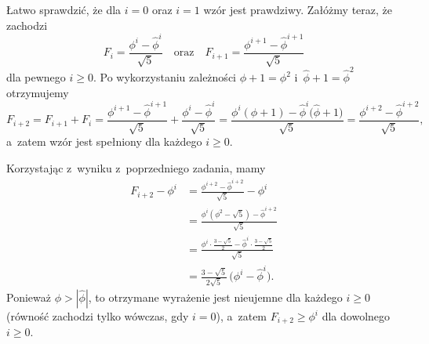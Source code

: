 \exercise %
Łatwo sprawdzić, że dla $i=0$ oraz $i=1$ wzór jest prawdziwy.
Załóżmy teraz, że zachodzi
\[
	F_i = \frac{\phi^i-\widehat\phi^i}{\sqrt{5}} \quad\text{oraz}\quad F_{i+1} = \frac{\phi^{i+1}-\widehat\phi^{i+1}}{\sqrt{5}}
\]
dla pewnego $i\ge0$.
Po wykorzystaniu zależności $\phi+1=\phi^2$ i~$\widehat\phi+1=\widehat\phi^2$ otrzymujemy
\[
	F_{i+2} = F_{i+1}+F_i = \frac{\phi^{i+1}-\widehat\phi^{i+1}}{\sqrt{5}}+\frac{\phi^i-\widehat\phi^i}{\sqrt{5}} = \frac{\phi^i(\phi+1)-\widehat\phi^i\bigl(\widehat\phi+1\bigr)}{\sqrt{5}} = \frac{\phi^{i+2}-\widehat\phi^{i+2}}{\sqrt{5}},
\]
a~zatem wzór jest spełniony dla każdego $i\ge0$.

\exercise %
Korzystając z~wyniku z~poprzedniego zadania, mamy
\begin{align*}
    F_{i+2}-\phi^i &= \frac{\phi^{i+2}-\widehat\phi^{i+2}}{\sqrt{5}}-\phi^i \\[1mm]
	&= \frac{\phi^i(\phi^2-\sqrt{5})-\widehat\phi^{i+2}}{\sqrt{5}} \\[1mm]
	&= \frac{\phi^i\cdot\frac{3-\sqrt{5}}{2}-\widehat\phi^i\cdot\frac{3-\sqrt{5}}{2}}{\sqrt{5}} \\
	&= \frac{3-\sqrt{5}}{2\sqrt{5}}\,\bigl(\phi^i-\widehat\phi^i\bigr).
\end{align*}
Ponieważ $\phi>|\widehat\phi|$, to otrzymane wyrażenie jest nieujemne dla każdego $i\ge0$ (równość zachodzi tylko wówczas, gdy $i=0$), a~zatem $F_{i+2}\ge\phi^i$ dla dowolnego $i\ge0$.
